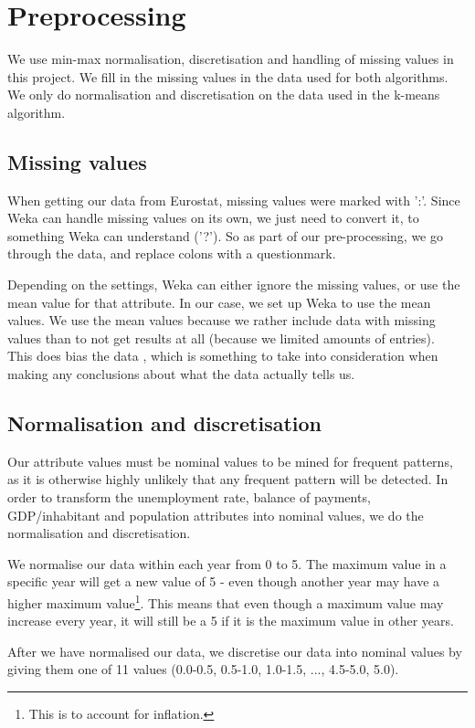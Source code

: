 \section{Preprocessing}
\label{PreP}
We use min-max normalisation, discretisation and handling of missing values in this project. We fill in the missing values in the data used for both algorithms. We only do normalisation and discretisation on the data used in the k-means algorithm.

\subsection{Missing values}
When getting our data from Eurostat, missing values were marked with ':'. Since Weka can handle missing values on its own, we just need to convert it, to something Weka can understand ('?'). So as part of our pre-processing, we go through the data, and replace colons with a questionmark.

Depending on the settings, Weka can either ignore the missing values, or use the mean value for that attribute. In our case, we set up Weka to use the mean values. We use the mean values because we rather include data with missing values than to not get results at all (because we limited amounts of entries). 
\\This does bias the data \cite[p. ~90]{DataMining}, which is something to take into consideration when making any conclusions about what the data actually tells us.

\subsection{Normalisation and discretisation}
Our attribute values must be nominal values to be mined for frequent patterns, as it is otherwise highly unlikely that any frequent pattern will be detected. In order to transform the unemployment rate, balance of payments, GDP/inhabitant and population attributes into nominal values, we do the normalisation and discretisation.

We normalise our data within each year from 0 to 5. The maximum value in a specific year will get a new value of 5 - even though another year may have a higher maximum value\footnote{This is to account for inflation.}. This means that even though a maximum value may increase every year, it will still be a 5 if it is the maximum value in other years.

After we have normalised our data, we discretise our data into nominal values by giving them one of 11 values (0.0-0.5, 0.5-1.0, 1.0-1.5, ..., 4.5-5.0, 5.0).